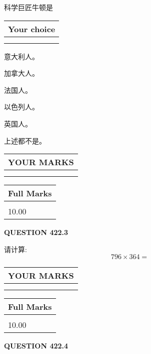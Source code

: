 \documentclass{ctexart}
\begin{document}
  
科学巨匠牛顿是
  
  
\noindent\hspace{3.0in} \begin{tabular}{|l|}
\hline
Your choice \\
\hline
 \\ 
 \\ 
\hline
\end{tabular}
  
  
 
 
意大利人。
 
 
加拿大人。
 
 
法国人。
 
 
以色列人。
 
 
英国人。
 
 
 上述都不是。
 
 
  
\vspace{0.2in}
  
\noindent\begin{tabular}{|l|}
\hline
 YOUR MARKS  \\
\hline
 \\ 
 \\ 
\hline
\end{tabular}
\hspace{0.05in} \begin{tabular}{|l|}
\hline
 Full Marks  \\
\hline
 \\ 
10.00 \\
\hline
\end{tabular}
{\textbf{\Large{QUESTION
422.3 
}}}
  
  
 
请计算:
\begin{equation}
796  \times    %
364 = \nonumber
\end{equation}
 

 

 
  
\vspace{0.2in}
  
\noindent\begin{tabular}{|l|}
\hline
 YOUR MARKS  \\
\hline
 \\ 
 \\ 
\hline
\end{tabular}
\hspace{0.05in} \begin{tabular}{|l|}
\hline
 Full Marks  \\
\hline
 \\ 
10.00 \\
\hline
\end{tabular}
{\textbf{\Large{QUESTION
422.4 
}}}
  
\end{document}
